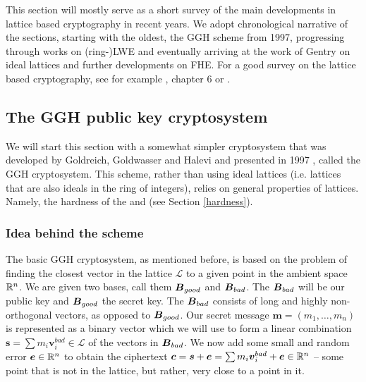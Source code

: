 
This section will mostly serve as a short survey of the main developments in lattice based cryptography in recent years. We adopt chronological narrative of the sections, starting with the oldest, the GGH scheme from 1997, progressing through works on (ring-)LWE and eventually arriving at the work of Gentry \cite{gentry_phd} on ideal lattices and further developments on FHE. For a good survey on the lattice based cryptography, see for example \cite{two_faces}, \cite{book} chapter 6 or \cite{lattice-survey}.

\subsection{The GGH public key cryptosystem}
We will start this section with a somewhat simpler cryptosystem that was developed by Goldreich, Goldwasser and Halevi and presented in 1997 \cite{ggh}, called the GGH cryptosystem. This scheme, rather than using ideal lattices (i.e. lattices that are also ideals in the ring of integers), relies on general properties of lattices. Namely, the hardness of the  and  (see Section \ref{hardness}).

\subsubsection*{Idea behind the scheme}
The basic GGH cryptosystem, as mentioned before, is based on the problem of finding the closest vector in the lattice $\mathcal{L}$ to a given point in the ambient space $\mathbb{R}^n$. We are given two bases, call them $\boldsymbol{B}_{good}$ and $\boldsymbol{B}_{bad}$. The $\boldsymbol{B}_{bad}$ will be our public key and $\boldsymbol{B}_{good}$ the secret key. The $\boldsymbol{B}_{bad}$ consists of long and highly non-orthogonal vectors, as opposed to $\boldsymbol{B}_{good}$. Our secret message $\bm{m} = (m_1, \ldots, m_n)$ is represented as a binary vector which we will use to form a linear combination $\bm{s} = \sum m_i \bm{v}_i^{bad} \in \mathcal{L}$ of the vectors in $\boldsymbol{B}_{bad}$. We now add some small and random error $\boldsymbol{e} \in \mathbb{R}^n$ to obtain the ciphertext $\boldsymbol{c} = \boldsymbol{s} + \boldsymbol{e} = \sum m_i \boldsymbol{v}_i^{bad} + \boldsymbol{e} \in \mathbb{R}^n$ -- some point that is not in the lattice, but rather, very close to a point in it.

